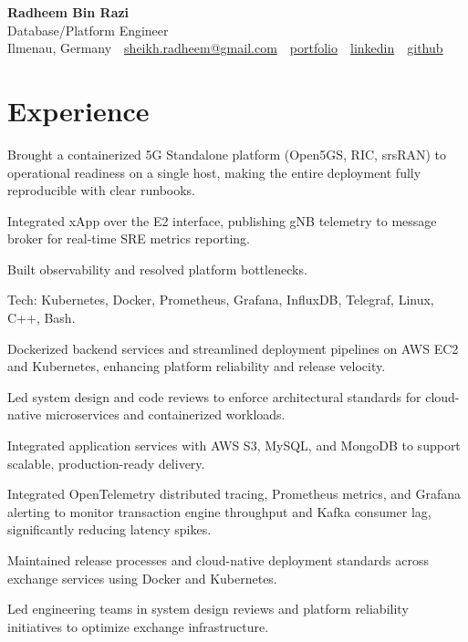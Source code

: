 \documentclass[10pt,a4paper]{resume}
\makeatletter
\newcommand{\Portfolio}{https://radheem.github.io/my-cv}
\newcommand{\PortfolioText}{portfolio}
\newcommand{\GitHub}{https://github.com/radheem}
\newcommand{\LinkedIn}{https://www.linkedin.com/in/radheem-razi}
\newcommand{\Email}{sheikh.radheem@gmail.com}
\makeatother
\begin{document}
\begin{center}
  {\huge\bfseries Radheem Bin Razi}\\[3pt]
  {\large Database/Platform Engineer}\\[6pt]
  \small
  Ilmenau, Germany \,\textbar\,
  \href{mailto:\Email}{\Email} \,\textbar\,
  \href{\Portfolio}{\PortfolioText} \,\textbar\,
  \href{\LinkedIn}{linkedin} \,\textbar\,
  \href{\GitHub}{github}
\end{center}
\vspace{2pt}

\section{Experience}

\bullets
  \item Brought a containerized 5G Standalone platform (Open5GS, RIC, srsRAN) to operational readiness on a single host, making the entire deployment fully reproducible with clear runbooks.
  \item Integrated xApp over the E2 interface, publishing gNB telemetry to message broker for real-time SRE metrics reporting.
  \item Built observability and resolved platform bottlenecks.
  \item Tech: Kubernetes, Docker, Prometheus, Grafana, InfluxDB, Telegraf, Linux, C++, Bash.
\bulletsend
\vspace{1.5pt}
\bullets
  \item Dockerized backend services and streamlined deployment pipelines on AWS EC2 and Kubernetes, enhancing platform reliability and release velocity.
  \item Led system design and code reviews to enforce architectural standards for cloud-native microservices and containerized workloads.
  \item Integrated application services with AWS S3, MySQL, and MongoDB to support scalable, production-ready delivery.
\bulletsend
\vspace{1.5pt}
\bullets
  \item Integrated OpenTelemetry distributed tracing, Prometheus metrics, and Grafana alerting to monitor transaction engine throughput and Kafka consumer lag, significantly reducing latency spikes.
  \item Maintained release processes and cloud-native deployment standards across exchange services using Docker and Kubernetes.
  \item Led engineering teams in system design reviews and platform reliability initiatives to optimize exchange infrastructure.
\bulletsend
\vspace{1.5pt}
\end{document}
